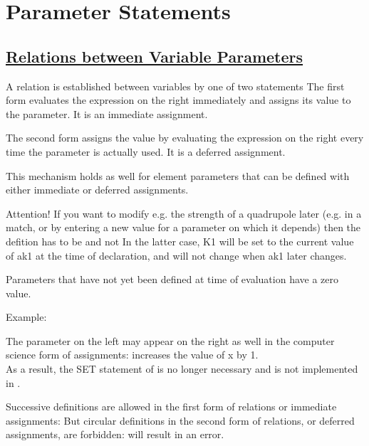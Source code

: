 

\chapter{Parameter Statements}
\label{chap:parameter}

\section{\href{relation}{Relations between Variable Parameters}}
 A relation is established between variables by one of two statements 
The first form evaluates the expression on the right immediately and
assigns its value to the parameter. It is an immediate assignment.

The second form assigns the value by evaluating  the expression on the
right every time the parameter is actually used. It is a deferred
assignment.  

This mechanism holds as well for element parameters that can be defined
with either immediate or deferred assignments.

Attention! If you want
to modify e.g. the strength of a quadrupole later (e.g. in a match,  or
by entering a new value for a parameter on which it depends) then the
defition has to be  
and not 
In the latter case, K1 will be set to the current value of ak1 at the
time of declaration, and will not change when ak1 later changes.  

Parameters that have not yet been defined at time of evaluation have a
zero value. 

Example: 

The parameter on the left may appear on the right as well in the
computer science form of assignments: 
increases the value of x by 1. \\
As a result, the SET statement of \madeight is no longer necessary and
is not implemented in \madx.   


Successive definitions are allowed in the first form of relations or 
immediate assignments:
But circular definitions in the second form of relations, or
deferred assignments, are forbidden: 
will result in an error.


